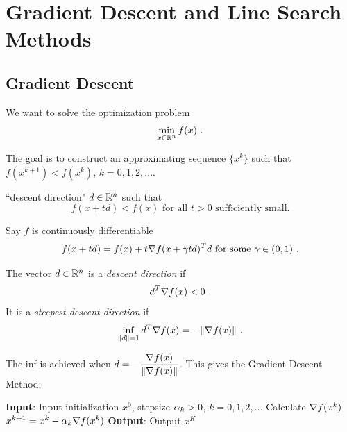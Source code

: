 \chapter{Gradient Descent and Line Search Methods}
\label{Ch:GDLineSearches}


\section{Gradient Descent}

We want to solve the optimization problem $$\min\limits_{x\in \mathbb R^n}f(x) \ .$$

The goal is to construct an approximating sequence $\{x^k\}$ such that
$f(x^{k+1})<f(x^k)$, $k=0,1,2,...$.

``descent direction" $d\in \mathbb R^n$ such that
$$f(x+td)<f(x) \text{ for all } t>0 \text{ sufficiently small}.$$

Say $f$ is continuously differentiable
$$f(x+td)=f(x)+t\nabla f(x+\gamma td)^Td \text{ for some } \gamma\in (0,1) \ .$$

\begin{definition}\label{Def:DescentDirection}
The vector $d\in \mathbb R^n$ is a \emph{descent direction} if $$d^T\grad f(x)<0 \ .$$
It is a \emph{steepest descent direction} if 
$$\inf\li_{\|d\|=1}d^T \grad f(x)=-\|\grad f(x)\| \ .$$
\end{definition}

The inf is achieved when $d=-\dfrac{\nabla f(x)}{\|\nabla f(x)\|}$. This gives the Gradient Descent Method:

\begin{algorithm}[H]
\caption{Gradient Descent}
\label{Alg:GD}
\begin{algorithmic}[1]
\STATE \textbf{Input}: Input initialization $x^0$, stepsize $\alpha_k>0$, $k=0,1,2,...$
    \STATE Calculate $\nabla f(x^k)$
    \STATE $x^{k+1}=x^k-\alpha_k\nabla f(x^k)$
\ENDFOR
\STATE \textbf{Output}: Output $x^K$
\end{algorithmic}
\end{algorithm}

